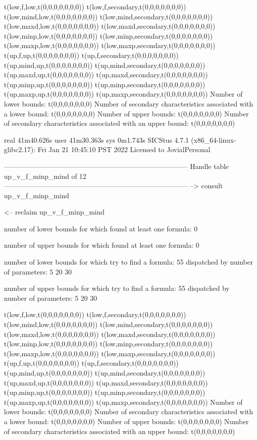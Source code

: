 t(low,f,low,t(0,0,0,0,0,0,0))
t(low,f,secondary,t(0,0,0,0,0,0,0))
t(low,mind,low,t(0,0,0,0,0,0,0))
t(low,mind,secondary,t(0,0,0,0,0,0,0))
t(low,maxd,low,t(0,0,0,0,0,0,0))
t(low,maxd,secondary,t(0,0,0,0,0,0,0))
t(low,minp,low,t(0,0,0,0,0,0,0))
t(low,minp,secondary,t(0,0,0,0,0,0,0))
t(low,maxp,low,t(0,0,0,0,0,0,0))
t(low,maxp,secondary,t(0,0,0,0,0,0,0))
t(up,f,up,t(0,0,0,0,0,0,0))
t(up,f,secondary,t(0,0,0,0,0,0,0))
t(up,mind,up,t(0,0,0,0,0,0,0))
t(up,mind,secondary,t(0,0,0,0,0,0,0))
t(up,maxd,up,t(0,0,0,0,0,0,0))
t(up,maxd,secondary,t(0,0,0,0,0,0,0))
t(up,minp,up,t(0,0,0,0,0,0,0))
t(up,minp,secondary,t(0,0,0,0,0,0,0))
t(up,maxp,up,t(0,0,0,0,0,0,0))
t(up,maxp,secondary,t(0,0,0,0,0,0,0))
Number of lower bounds:                                             t(0,0,0,0,0,0,0)
Number of secondary characteristics associated with a lower bound:  t(0,0,0,0,0,0,0)
Number of upper bounds:                                             t(0,0,0,0,0,0,0)
Number of secondary characteristics associated with an upper bound: t(0,0,0,0,0,0,0)

real	41m40.626s
user	41m30.363s
sys	0m1.743s
SICStus 4.7.1 (x86_64-linux-glibc2.17): Fri Jan 21 10:45:10 PST 2022
Licensed to JovialPersonal


--------------------------------------------------------------------------------
Handle table up_v_f_minp_mind of 12
--------------------------------------------------------------------------------
--> consult up_v_f_minp_mind

<-- reclaim up_v_f_minp_mind

number of lower bounds for which found at least one formula: 0

number of upper bounds for which found at least one formula: 0

number of lower bounds for which try to find a formula: 55
dispatched by number of parameters: 5  20  30

number of upper bounds for which try to find a formula: 55
dispatched by number of parameters: 5  20  30

t(low,f,low,t(0,0,0,0,0,0,0))
t(low,f,secondary,t(0,0,0,0,0,0,0))
t(low,mind,low,t(0,0,0,0,0,0,0))
t(low,mind,secondary,t(0,0,0,0,0,0,0))
t(low,maxd,low,t(0,0,0,0,0,0,0))
t(low,maxd,secondary,t(0,0,0,0,0,0,0))
t(low,minp,low,t(0,0,0,0,0,0,0))
t(low,minp,secondary,t(0,0,0,0,0,0,0))
t(low,maxp,low,t(0,0,0,0,0,0,0))
t(low,maxp,secondary,t(0,0,0,0,0,0,0))
t(up,f,up,t(0,0,0,0,0,0,0))
t(up,f,secondary,t(0,0,0,0,0,0,0))
t(up,mind,up,t(0,0,0,0,0,0,0))
t(up,mind,secondary,t(0,0,0,0,0,0,0))
t(up,maxd,up,t(0,0,0,0,0,0,0))
t(up,maxd,secondary,t(0,0,0,0,0,0,0))
t(up,minp,up,t(0,0,0,0,0,0,0))
t(up,minp,secondary,t(0,0,0,0,0,0,0))
t(up,maxp,up,t(0,0,0,0,0,0,0))
t(up,maxp,secondary,t(0,0,0,0,0,0,0))
Number of lower bounds:                                             t(0,0,0,0,0,0,0)
Number of secondary characteristics associated with a lower bound:  t(0,0,0,0,0,0,0)
Number of upper bounds:                                             t(0,0,0,0,0,0,0)
Number of secondary characteristics associated with an upper bound: t(0,0,0,0,0,0,0)

